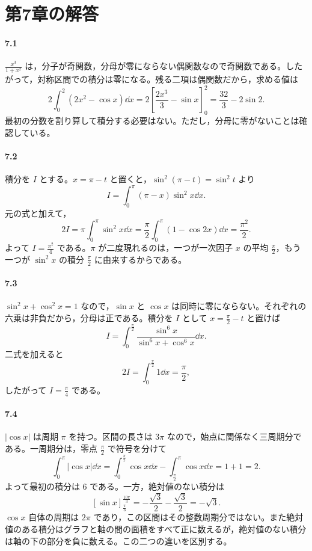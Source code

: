 \section{第7章の解答}\label{解答:第7章}

\paragraph{7.1}
$\frac{x^3}{1+x^2}$ は，分子が奇関数，分母が零にならない偶関数なので奇関数である。したがって，対称区間での積分は零になる。残る二項は偶関数だから，求める値は
\[
2\int_0^2(2x^2-\cos x)\dd x
 =2\left[\frac{2x^3}{3}-\sin x\right]_0^2
 =\frac{32}{3}-2\sin2.
\]
最初の分数を割り算して積分する必要はない。ただし，分母に零がないことは確認している。

\paragraph{7.2}
積分を $I$ とする。$x=\pi-t$ と置くと，$\sin^2(\pi-t)=\sin^2t$ より
\[
I=\int_0^\pi(\pi-x)\sin^2x\dd x.
\]
元の式と加えて，
\[
2I=\pi\int_0^\pi\sin^2x\dd x
 =\frac{\pi}{2}\int_0^\pi(1-\cos2x)\dd x
 =\frac{\pi^2}{2}.
\]
よって $I=\frac{\pi^2}{4}$ である。$\pi$ が二度現れるのは，一つが一次因子 $x$ の平均 $\frac{\pi}{2}$，もう一つが $\sin^2x$ の積分 $\frac{\pi}{2}$ に由来するからである。

\paragraph{7.3}
$\sin^2x+\cos^2x=1$ なので，$\sin x$ と $\cos x$ は同時に零にならない。それぞれの六乗は非負だから，分母は正である。積分を $I$ として $x=\frac{\pi}{2}-t$ と置けば
\[
I=\int_0^{\frac{\pi}{2}}
\frac{\sin^6x}{\sin^6x+\cos^6x}\dd x.
\]
二式を加えると
\[
2I=\int_0^{\frac{\pi}{2}}1\dd x=\frac{\pi}{2},
\]
したがって $I=\frac{\pi}{4}$ である。

\paragraph{7.4}
$|\cos x|$ は周期 $\pi$ を持つ。区間の長さは $3\pi$ なので，始点に関係なく三周期分である。一周期分は，零点 $\frac{\pi}{2}$ で符号を分けて
\[
\int_0^\pi|\cos x|\dd x
 =\int_0^{\frac{\pi}{2}}\cos x\dd x
  -\int_{\frac{\pi}{2}}^\pi\cos x\dd x
 =1+1=2.
\]
よって最初の積分は $6$ である。一方，絶対値のない積分は
\[
\left[\sin x\right]_{\frac{\pi}{3}}^{\frac{10\pi}{3}}
 =-\frac{\sqrt3}{2}-\frac{\sqrt3}{2}
 =-\sqrt3.
\]
$\cos x$ 自体の周期は $2\pi$ であり，この区間はその整数周期分ではない。また絶対値のある積分はグラフと軸の間の面積をすべて正に数えるが，絶対値のない積分は軸の下の部分を負に数える。この二つの違いを区別する。

